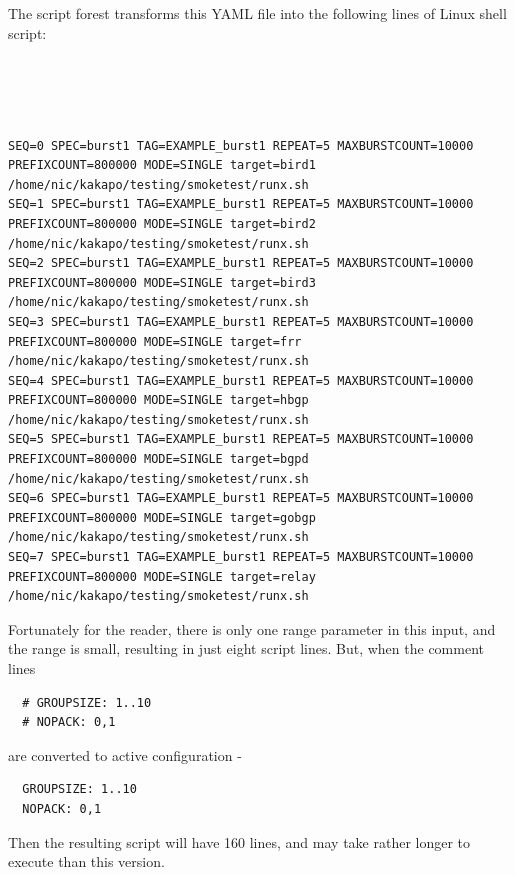 The script forest transforms this YAML file into the following lines of Linux shell script:
\begin{lstlisting}[basicstyle=\fontsize{10pt}{16pt}\selectfont\ttfamily]


    

SEQ=0 SPEC=burst1 TAG=EXAMPLE_burst1 REPEAT=5 MAXBURSTCOUNT=10000 PREFIXCOUNT=800000 MODE=SINGLE target=bird1 /home/nic/kakapo/testing/smoketest/runx.sh
SEQ=1 SPEC=burst1 TAG=EXAMPLE_burst1 REPEAT=5 MAXBURSTCOUNT=10000 PREFIXCOUNT=800000 MODE=SINGLE target=bird2 /home/nic/kakapo/testing/smoketest/runx.sh
SEQ=2 SPEC=burst1 TAG=EXAMPLE_burst1 REPEAT=5 MAXBURSTCOUNT=10000 PREFIXCOUNT=800000 MODE=SINGLE target=bird3 /home/nic/kakapo/testing/smoketest/runx.sh
SEQ=3 SPEC=burst1 TAG=EXAMPLE_burst1 REPEAT=5 MAXBURSTCOUNT=10000 PREFIXCOUNT=800000 MODE=SINGLE target=frr /home/nic/kakapo/testing/smoketest/runx.sh
SEQ=4 SPEC=burst1 TAG=EXAMPLE_burst1 REPEAT=5 MAXBURSTCOUNT=10000 PREFIXCOUNT=800000 MODE=SINGLE target=hbgp /home/nic/kakapo/testing/smoketest/runx.sh
SEQ=5 SPEC=burst1 TAG=EXAMPLE_burst1 REPEAT=5 MAXBURSTCOUNT=10000 PREFIXCOUNT=800000 MODE=SINGLE target=bgpd /home/nic/kakapo/testing/smoketest/runx.sh
SEQ=6 SPEC=burst1 TAG=EXAMPLE_burst1 REPEAT=5 MAXBURSTCOUNT=10000 PREFIXCOUNT=800000 MODE=SINGLE target=gobgp /home/nic/kakapo/testing/smoketest/runx.sh
SEQ=7 SPEC=burst1 TAG=EXAMPLE_burst1 REPEAT=5 MAXBURSTCOUNT=10000 PREFIXCOUNT=800000 MODE=SINGLE target=relay /home/nic/kakapo/testing/smoketest/runx.sh

\end{lstlisting}


 Fortunately for the reader, there is only one range parameter in this input, and the range is small, resulting in just eight script lines.
 But, when the comment lines\begin{verbatim}
  # GROUPSIZE: 1..10
  # NOPACK: 0,1    
\end{verbatim}

are converted to active configuration - 

\begin{verbatim}
  GROUPSIZE: 1..10
  NOPACK: 0,1    
\end{verbatim}

Then the resulting script will have 160 lines, and may take rather longer to execute than this version.

